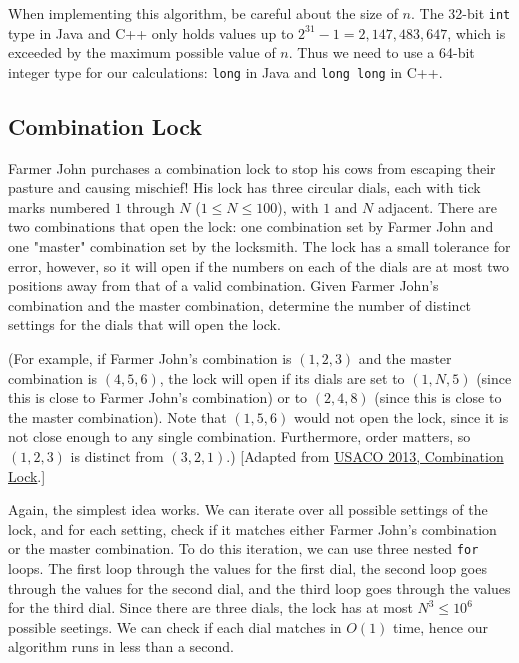 When implementing this algorithm, be careful about the size of $n$. The 32-bit \texttt{int} type in Java and C++ only holds values up to $2^{31} - 1 = 2,147,483,647$, which is exceeded by the maximum possible value of $n$. Thus we need to use a 64-bit integer type for our calculations: \texttt{long} in Java and \texttt{long long} in C++.

\subsection{Combination Lock}

\begin{typewriter}
  Farmer John purchases a combination lock to stop his cows from escaping their pasture and causing mischief! His lock has three circular dials, each with tick marks numbered $1$ through $N$ ($1\le N\le 100$), with $1$ and $N$ adjacent. There are two combinations that open the lock: one combination set by Farmer John and one "master" combination set by the locksmith. The lock has a small tolerance for error, however, so it will open if the numbers on each of the dials are at most two positions away from that of a valid combination. Given Farmer John's combination and the master combination, determine the number of distinct settings for the dials that will open the lock. 

  (For example, if Farmer John's combination is $(1,2,3)$ and the master combination is $(4,5,6)$, the lock will open if its dials are set to $(1,N,5)$ (since this is close to Farmer John's combination) or to $(2,4,8)$ (since this is close to the master combination). Note that $(1,5,6)$ would not open the lock, since it is not close enough to any single combination. Furthermore, order matters, so $(1,2,3)$ is distinct from $(3,2,1)$.) [Adapted from \href{http://usaco.org/index.php?page=viewproblem2&cpid=340}{USACO 2013, Combination Lock}.]
\end{typewriter}

Again, the simplest idea works. We can iterate over all possible settings of the lock, and for each setting, check if it matches either Farmer John's combination or the master combination. To do this iteration, we can use three nested \texttt{for} loops. The first loop through the values for the first dial, the second loop goes through the values for the second dial, and the third loop goes through the values for the third dial. Since there are three dials, the lock has at most $N^3 \le 10^6$ possible seetings. We can check if each dial matches in $O(1)$ time, hence our algorithm runs in less than a second.

